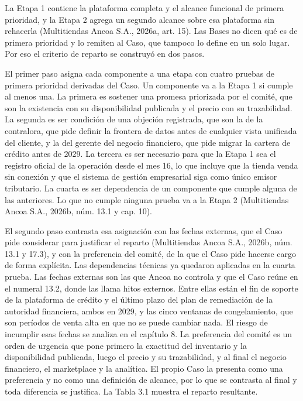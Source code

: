 \documentclass[11pt]{article}
\begin{document}
La Etapa 1 contiene la plataforma completa y el alcance funcional de primera prioridad, y la Etapa 2 agrega un segundo alcance sobre esa plataforma sin rehacerla (Multitiendas Ancoa S.A., 2026a, art. 15). Las Bases no dicen qué es de primera prioridad y lo remiten al Caso, que tampoco lo define en un solo lugar. Por eso el criterio de reparto se construyó en dos pasos.

El primer paso asigna cada componente a una etapa con cuatro pruebas de primera prioridad derivadas del Caso. Un componente va a la Etapa 1 si cumple al menos una. La primera es sostener una promesa priorizada por el comité, que son la existencia con su disponibilidad publicada y el precio con su trazabilidad. La segunda es ser condición de una objeción registrada, que son la de la contralora, que pide definir la frontera de datos antes de cualquier vista unificada del cliente, y la del gerente del negocio financiero, que pide migrar la cartera de crédito antes de 2029. La tercera es ser necesario para que la Etapa 1 sea el registro oficial de la operación desde el mes 16, lo que incluye que la tienda venda sin conexión y que el sistema de gestión empresarial siga como único emisor tributario. La cuarta es ser dependencia de un componente que cumple alguna de las anteriores. Lo que no cumple ninguna prueba va a la Etapa 2 (Multitiendas Ancoa S.A., 2026b, núm. 13.1 y cap. 10).

El segundo paso contrasta esa asignación con las fechas externas, que el Caso pide considerar para justificar el reparto (Multitiendas Ancoa S.A., 2026b, núm. 13.1 y 17.3), y con la preferencia del comité, de la que el Caso pide hacerse cargo de forma explícita. Las dependencias técnicas ya quedaron aplicadas en la cuarta prueba. Las fechas externas son las que Ancoa no controla y que el Caso reúne en el numeral 13.2, donde las llama hitos externos. Entre ellas están el fin de soporte de la plataforma de crédito y el último plazo del plan de remediación de la autoridad financiera, ambos en 2029, y las cinco ventanas de congelamiento, que son períodos de venta alta en que no se puede cambiar nada. El riesgo de incumplir esas fechas se analiza en el capítulo 8. La preferencia del comité es un orden de urgencia que pone primero la exactitud del inventario y la disponibilidad publicada, luego el precio y su trazabilidad, y al final el negocio financiero, el marketplace y la analítica. El propio Caso la presenta como una preferencia y no como una definición de alcance, por lo que se contrasta al final y toda diferencia se justifica. La Tabla 3.1 muestra el reparto resultante.
\end{document}
